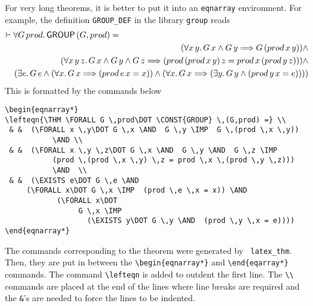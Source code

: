 For very long theorems, it is better to put it into an {\tt eqnarray}
environment. For example, the definition {\tt GROUP\_DEF} in the
library {\tt group} reads
\begin{eqnarray*}
\lefteqn{\THM \FORALL G \,prod\DOT \CONST{GROUP} \,(G,prod) =} \\
 & &     (\FORALL x \,y\DOT G \,x \AND  G \,y \IMP  G \,(prod \,x \,y))
           \AND \\
 & &     (\FORALL x \,y \,z\DOT G \,x \AND  G \,y \AND  G \,z \IMP 
           (prod \,(prod \,x \,y) \,z = prod \,x \,(prod \,y \,z)))
           \AND  \\
 & &     (\EXISTS e\DOT G \,e \AND  
 	   (\FORALL x\DOT G \,x \IMP  (prod \,e \,x = x)) \AND 
              (\FORALL x\DOT
                   G \,x \IMP 
                      (\EXISTS y\DOT G \,y \AND  (prod \,y \,x = e))))
\end{eqnarray*}
This is formatted by the commands below
\begin{verbatim}
\begin{eqnarray*}
\lefteqn{\THM \FORALL G \,prod\DOT \CONST{GROUP} \,(G,prod) =} \\
 & &  (\FORALL x \,y\DOT G \,x \AND  G \,y \IMP  G \,(prod \,x \,y))
           \AND \\
 & &  (\FORALL x \,y \,z\DOT G \,x \AND  G \,y \AND  G \,z \IMP 
           (prod \,(prod \,x \,y) \,z = prod \,x \,(prod \,y \,z)))
           \AND  \\
 & &  (\EXISTS e\DOT G \,e \AND  
 	 (\FORALL x\DOT G \,x \IMP  (prod \,e \,x = x)) \AND 
            (\FORALL x\DOT
                 G \,x \IMP 
                   (\EXISTS y\DOT G \,y \AND  (prod \,y \,x = e))))
\end{eqnarray*}
\end{verbatim}
The commands corresponding to the theorem were generated by {\tt
latex\_thm}. Then, they are put in between the \verb|\begin{eqnarray*}| and
\verb|\end{eqarray*}| commands. The command \verb|\lefteqn| is added to outdent
the first line. The \verb|\\| commands are placed at the end of
the lines where line breaks are required and the \verb|&|'s are needed
to force the lines to be indented.



